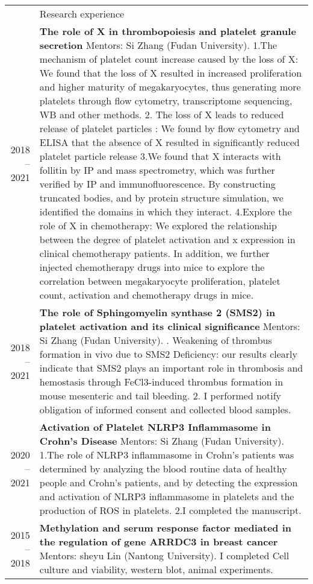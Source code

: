 \documentclass[letterpaper, 11pt]{article}
\newcommand{\headingfont}{\Large\color{OliveGreen}}
\newenvironment{SectionTable}[1]{
	\renewcommand*{\arraystretch}{1.7}
	\setlength{\tabcolsep}{10pt}
	\begin{longtable}{Rp{5.2in}} & #1 \\}
{\end{longtable}\vspace{-.3cm}}
\begin{document}
\begin{SectionTable}{\headingfont Research experience}
2018 -- 2021 &
\textbf{The role of X in thrombopoiesis and platelet granule secretion} \newline
Mentors: Si Zhang (Fudan University). \newline
1.The mechanism of platelet count increase caused by the loss of X: We found that the loss of X resulted in increased proliferation and higher maturity of megakaryocytes, thus generating more platelets through flow cytometry, transcriptome sequencing, WB and other methods.
2. The loss of X leads to reduced release of platelet particles : We found by flow cytometry and ELISA that the absence of X resulted in significantly reduced platelet particle release
3.We found that X interacts with follitin by IP and mass spectrometry, which was further verified by IP and immunofluorescence. By constructing truncated bodies, and by protein structure simulation, we identified the domains in which they interact.
4.Explore the role of X in chemotherapy: We explored the relationship between the degree of platelet activation and x expression in clinical chemotherapy patients. In addition, we further injected chemotherapy drugs into mice to explore the correlation between megakaryocyte proliferation, platelet count, activation and chemotherapy drugs in mice. \\

2018 -- 2021 &
\textbf{The role of Sphingomyelin synthase 2 (SMS2) in platelet activation and its clinical significance} \newline
Mentors:  Si Zhang (Fudan University). . Weakening of thrombus formation in vivo due to SMS2 Deficiency: our results clearly indicate that SMS2 plays an
important role in thrombosis and hemostasis through FeCl3-induced thrombus formation in mouse mesenteric and tail bleeding.
2. I performed notify obligation of informed consent and collected blood samples. \\

2020 -- 2021 &
\textbf{Activation of Platelet NLRP3 Inflammasome in Crohn’s Disease} \newline
Mentors: Si Zhang (Fudan University). \newline
1.The role of NLRP3 inflammasome in Crohn's patients was determined by analyzing the blood routine data of healthy people and Crohn's patients, and by detecting the expression and activation of NLRP3 inflammasome in platelets and the production of ROS in platelets.
2.I completed the manuscript. \\

2015 -- 2018 &
\textbf{Methylation and serum response factor mediated in the regulation of gene ARRDC3 in breast cancer} \newline
Mentors: sheyu Lin (Nantong University). \newline
I completed Cell culture and viability, western blot, animal experiments. \\
\end{SectionTable}
\end{document}
